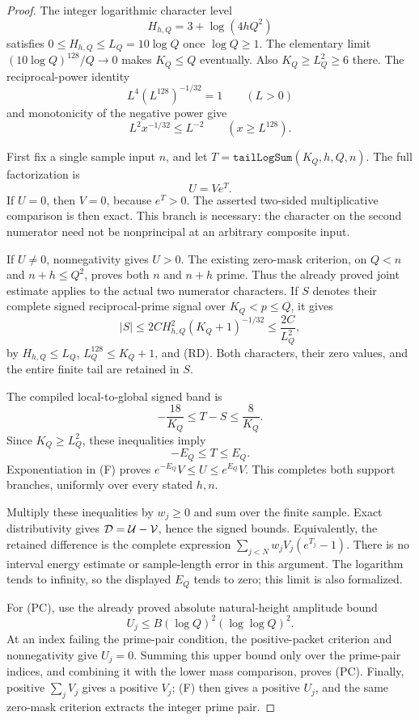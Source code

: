 \documentclass[11pt]{article}
\begin{document}
\begin{proof}
The integer logarithmic character level
\[
             H_{h,Q}=3+\log(4hQ^2)
\]
satisfies \(0\leq H_{h,Q}\leq L_Q=10\log Q\) once
\(\log Q\geq1\). The elementary limit
\((10\log Q)^{128}/Q\to0\) makes \(K_Q\leq Q\) eventually.
Also \(K_Q\geq L_Q^2\geq6\) there. The reciprocal-power
identity
\[
                 L^4(L^{128})^{-1/32}=1 \qquad(L>0)
\]
and monotonicity of the negative power give
\[
 L^2 x^{-1/32}\leq L^{-2}\qquad(x\geq L^{128}).
 \tag{RD}
\]

First fix a single sample input \(n\), and let
\(T=\texttt{tailLogSum}(K_Q,h,Q,n)\).
The full factorization is
\[
                              U=Ve^T.
 \tag{F}
\]
If \(U=0\), then \(V=0\), because \(e^T>0\). The asserted
two-sided multiplicative comparison is then exact.
This branch is necessary: the character on the second numerator
need not be nonprincipal at an arbitrary composite input.

If \(U\ne0\), nonnegativity gives \(U>0\). The existing zero-mask
criterion, on \(Q<n\) and \(n+h\leq Q^2\), proves both \(n\)
and \(n+h\) prime. Thus the already proved joint estimate applies
to the actual two numerator characters. If \(S\) denotes their
complete signed reciprocal-prime signal over
\(K_Q<p\leq Q\), it gives
\[
 |S|\leq
  2C H_{h,Q}^2(K_Q+1)^{-1/32}
       \leq\frac{2C}{L_Q^2},
\]
by \(H_{h,Q}\leq L_Q\), \(L_Q^{128}\leq K_Q+1\), and (RD).
Both characters, their zero values, and the entire finite tail are
retained in \(S\).

The compiled local-to-global signed band is
\[
                       -\frac{18}{K_Q}\leq T-S
                                             \leq\frac8{K_Q}.
\]
Since \(K_Q\geq L_Q^2\), these inequalities imply
\[
                              -E_Q\leq T\leq E_Q.
\]
Exponentiation in (F) proves
\(e^{-E_Q}V\leq U\leq e^{E_Q}V\). This completes both support
branches, uniformly over every stated \(h,n\).

Multiply these inequalities by \(w_j\geq0\) and sum over the
finite sample. Exact distributivity gives
\({\cal D}={\cal U}-{\cal V}\), hence the signed bounds.
Equivalently, the retained difference is the complete expression
\(\sum_{j<N}w_jV_j(e^{T_j}-1)\). There is no interval
energy estimate or sample-length error in this argument.
The logarithm tends to infinity, so the displayed \(E_Q\) tends
to zero; this limit is also formalized.

For (PC), use the already proved absolute natural-height amplitude
bound
\[
             U_j\leq B(\log Q)^2(\log\log Q)^2.
\]
At an index failing the prime-pair condition, the positive-packet
criterion and nonnegativity give \(U_j=0\).
Summing this upper bound only over the prime-pair indices, and
combining it with the lower mass comparison, proves (PC).
Finally, positive \(\sum_j V_j\) gives a positive \(V_j\);
(F) then gives a positive \(U_j\), and the same zero-mask criterion
extracts the integer prime pair.
\end{proof}
\end{document}

